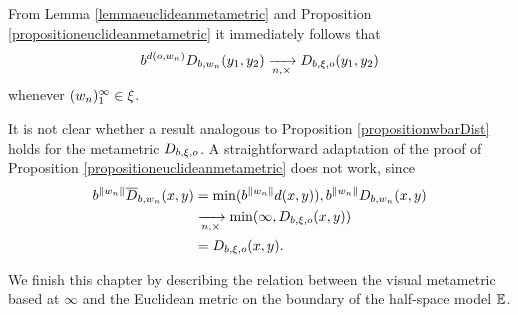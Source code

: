 From Lemma \ref{lemmaeuclideanmetametric} and Proposition \ref{propositioneuclideanmetametric} it immediately follows that
\begin{equation}
\label{euclideanmetrictendsasymp}
b^{d(o,w_n)} D_{b,w_n} (y_1,y_2) \xrightarrow[n,\times]{} D_{b,\xi,o}(y_1,y_2) 
\end{equation}
whenever $(w_n)_1^\infty\in\xi$.

\begin{remark}
It is not clear whether a result analogous to Proposition \ref{propositionwbarDist} holds for the metametric $D_{b,\xi,o}$. A straightforward adaptation of the proof of Proposition \ref{propositioneuclideanmetametric} does not work, since
\begin{align*}
b^{\|w_n\|}\overline{D}_{b,w_n}(x,y)
&= \min(b^{\|w_n\|}d(x,y)) , b^{\|w_n\|}D_{b,w_n}(x,y)\\
&\xrightarrow[n,\times]{} \min(\infty, D_{b,\xi,o}(x,y))\\
&= D_{b,\xi,o}(x,y).
\end{align*}
\end{remark}

We finish this chapter by describing the relation between the visual metametric based at $\infty$ and the Euclidean metric on the boundary of the half-space model $\E$.

